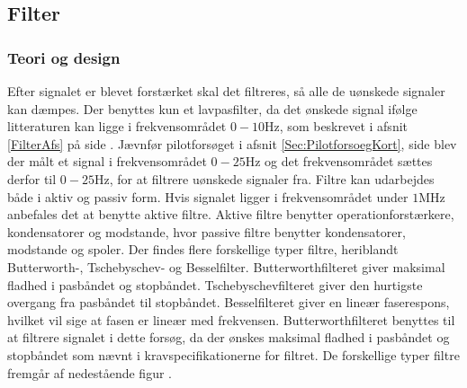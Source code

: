 \subsection{Filter}
\subsubsection{Teori og design}
Efter signalet er blevet forstærket skal det filtreres, så alle de uønskede signaler kan dæmpes. Der benyttes kun et lavpasfilter, da det ønskede signal ifølge litteraturen kan ligge i frekvensområdet $0-10$Hz, som beskrevet i afsnit \ref{FilterAfs} på side \pageref{FilterAfs}. Jævnfør pilotforsøget i afsnit \ref{Sec:PilotforsoegKort}, side \pageref{Sec:PilotforsoegKort} blev der målt et signal i frekvensområdet $0-25$Hz og det frekvensområdet sættes derfor til $0-25$Hz, for at filtrere uønskede signaler fra. 
Filtre kan udarbejdes både i aktiv og passiv form. Hvis signalet ligger i frekvensområdet under $1$MHz anbefales det at benytte aktive filtre. Aktive filtre benytter operationforstærkere, kondensatorer og modstande, hvor passive filtre benytter kondensatorer, modstande og spoler. \cite{Carter2013} Der findes flere forskellige typer filtre, heriblandt Butterworth-, Tschebyschev- og Besselfilter. Butterworthfilteret giver maksimal fladhed i pasbåndet og stopbåndet. Tschebyschevfilteret giver den hurtigste overgang fra pasbåndet til stopbåndet. Besselfilteret giver en lineær faserespons, hvilket vil sige at fasen er lineær med frekvensen. \cite{Carter2013} Butterworthfilteret benyttes til at filtrere signalet i dette forsøg, da der ønskes maksimal fladhed i pasbåndet og stopbåndet som nævnt i kravspecifikationerne for filtret. De forskellige typer filtre fremgår af nedestående figur . 

